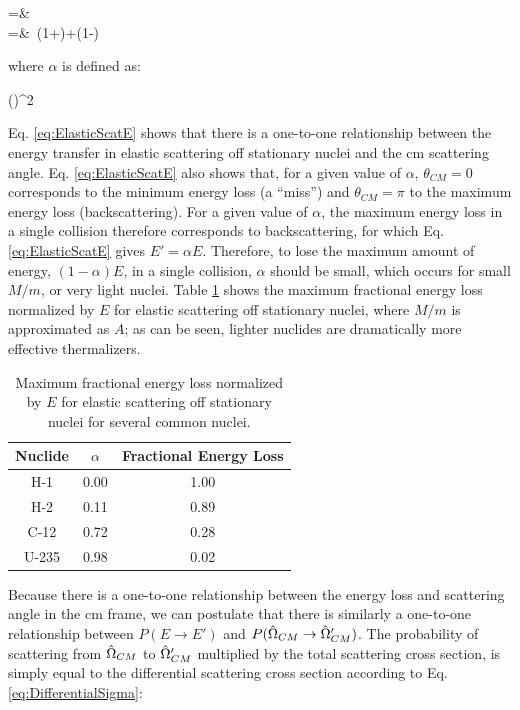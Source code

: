 \beqa
\label{eq:ElasticScatE}
=&\ \\
=&\ \left\lbrack(1+\alpha)+(1-\alpha)\right\rbrack\\
\eeqa

where \(\alpha\) is defined as:

\beq
\alpha\equiv\left(\right)^2
\eeq

Eq. \eqref{eq:ElasticScatE} shows that there is a one-to-one relationship between the energy transfer in elastic scattering off stationary nuclei and the \gls{cm} scattering angle. Eq. \eqref{eq:ElasticScatE} also shows that, for a given value of \(\alpha\), \(\theta_{CM}=0\) corresponds to the minimum energy loss (a ``miss'') and \(\theta_{CM}=\pi\) to the maximum energy loss (backscattering). For a given value of \(\alpha\), the maximum energy loss in a single collision therefore corresponds to backscattering, for which Eq. \eqref{eq:ElasticScatE} gives \(E'=\alpha E\). Therefore, to lose the maximum amount of energy, \((1-\alpha)E\), in a single collision, \(\alpha\) should be small, which occurs for small \(M/m\), or very light nuclei. Table \ref{table:FractionalEnergyLoss} shows the maximum fractional energy loss normalized by \(E\) for elastic scattering off stationary nuclei, where \(M/m\) is approximated as \(A\); as can be seen, lighter nuclides are dramatically more effective thermalizers.

\begin{table}[H]
\caption{Maximum fractional energy loss normalized by \(E\) for elastic scattering off stationary nuclei for several common nuclei.}
\centering
\begin{tabular}{c c c}
\hline\hline
Nuclide & \(\alpha\) & Fractional Energy Loss\\ [0.5ex]
\hline
H-1 & 0.00 & 1.00\\
H-2 & 0.11 & 0.89\\
C-12 & 0.72 & 0.28\\
U-235 & 0.98 & 0.02\\
\hline
\end{tabular}
\label{table:FractionalEnergyLoss}
\end{table}

Because there is a one-to-one relationship between the energy loss and scattering angle in the \gls{cm} frame, we can postulate that there is similarly a one-to-one relationship between \(P(E\rightarrow E')\) and \(P(\hat{\Omega}_{CM}\rightarrow\hat{\Omega}_{CM}')\). The probability of scattering from \(\hat{\Omega}_{CM}\) to \(\hat{\Omega}'_{CM}\) multiplied by the total scattering cross section, is simply equal to the differential scattering cross section according to Eq. \eqref{eq:DifferentialSigma}:

